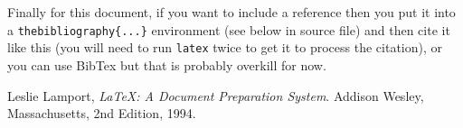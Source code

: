 \documentclass[a4wide, 11pt]{article}
\begin{document}
Finally for this document, if you want to include a reference
then you put it into a \texttt{thebibliography\{...\}}
environment (see below in source file) and then 
cite it like this \cite{lamport94}
(you will need to run \texttt{latex} twice to get it to process the citation),
or you can use BibTex but that is probably overkill for now.

\begin{thebibliography}{9}

  Leslie Lamport,
  \emph{\LaTeX: A Document Preparation System}.
  Addison Wesley, Massachusetts,
  2nd Edition,
  1994.

\end{thebibliography}
\end{document}
